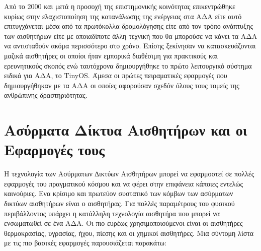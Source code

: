 Από το 2000 και μετά η προσοχή της επιστημονικής κοινότητας επικεντρώθηκε κυρίως στην ελαχιστοποίηση της κατανάλωσης της ενέργειας στα ΑΔΑ είτε αυτό επιτυγχάνεται
μέσα από τα πρωτόκολλα δρομολόγησης είτε από τον τρόπο ανάπτυξης των αισθητήρων είτε με οποιαδίποτε άλλη τεχνική που θα μπορούσε να κάνει τα ΑΔΑ να αντισταθούν ακόμα
περισσότερο στο χρόνο.
Επίσης ξεκίνησαν να κατασκευάζονται μαζικά αισθητήρες οι οποίοι ήταν εμπορικά διαθέσιμη για πρακτικούς και ερευνητικούς σκοπός ενώ ταυτόχρονα δημιουργήθηκε το πρώτο
λειτουργικό σύστημα ειδικά για ΑΔΑ, το TinyOS.
Άμεσα οι  πρώτες πειραματικές εφαρμογές που δημιουργήθηκαν με τα ΑΔΑ οι οποίες αφορούσαν σχεδόν όλους τους τομείς της ανθρώπινης δραστηριότητας.

\section{Ασύρματα Δίκτυα Αισθητήρων και οι Εφαρμογές τους}
Η τεχνολογία των Ασύρματων ∆ικτύων Αισθητήρων μπορεί να εφαρμοστεί σε πολλές εφαρμογές του πραγματικού κόσμου και να φέρει στην επιφάνεια κάποιες εντελώς καινούριες.
Ενα κρίσιμο και πρωτεύον συστατικό των κόμβων των ασύρματων δικτύων αισθητήρων είναι ο αισθητήρας.
Για πολλές παραμέτρους του φυσικού περιβάλλοντος υπάρχει η κατάλληλη τεχνολογία αισθητήρα που μπορεί να ενσωματωθεί σε ένα ΑΔΑ.
Οι πιο ευρέως χρησιμοποιούμενοι είναι οι αισθητήρες θερμοκρασίας, υγρασίας, ήχου, πίεσης και οι χημικοί αισθητήρες.
Μια σύντομη λίστα με τις πιο βασικές εφαρμογές παρουσιάζεται παρακάτω:
